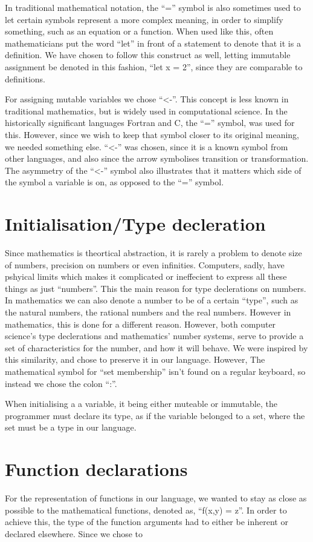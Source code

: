 In traditional mathematical notation, the \enquote{=} symbol is also sometimes used to let certain symbols represent a more complex meaning, in order to simplify something, such as an equation or a function. When used like this, often mathematicians put the word \enquote{let} in front of a statement to denote that it is a definition. We have chosen to follow this construct as well, letting immutable assignment be denoted in this fashion, \enquote{let x = 2}, since they are comparable to definitions.

For assigning mutable variables we chose \enquote{<-}. This concept is less known in traditional mathematics, but is widely used in computational science. In the historically significant languages Fortran and C, the \enquote{=} symbol, was used for this. However, since we wish to keep that symbol closer to its original meaning, we needed something else. \enquote{<-} was chosen, since it is a known symbol from other languages, and also since the arrow symbolises transition or transformation. The asymmetry of the \enquote{<-} symbol also illustrates that it matters which side of the symbol a variable is on, as opposed to the \enquote{=} symbol.


\section{Initialisation/Type decleration}

Since mathematics is theortical abstraction, it is rarely a problem to denote size of numbers, precision on numbers or even infinities. Computers, sadly, have pshyical limits which makes it complicated or ineffecient to express all these things as just \enquote{numbers}. This the main reason for type declerations on numbers. In mathematics we can also denote a number to be of a certain \enquote{type}, such as the natural numbers, the rational numbers and the real numbers. However in mathematics, this is done for a different reason. However, both computer science's type declerations and mathematics' number systems, serve to provide a set of characteristics for the number, and how it will behave. We were inspired by this similarity, and chose to preserve it in our language. However, The mathematical symbol for \enquote{set membership} isn't found on a regular keyboard, so instead we chose the colon \enquote{:}.

When initialising a a variable, it being either muteable or immutable, the programmer must declare its type, as if the variable belonged to a set, where the set must be a type in our language.



\section{Function declarations}

For the representation of functions in our language, we wanted to stay as close as possible to the mathematical functions, denoted as, \enquote{f(x,y) = z}. In order to achieve this, the type of the function arguments had to either be inherent or declared elsewhere. Since we chose to 